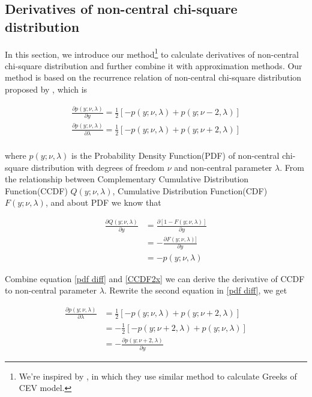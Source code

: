 \subsection{Derivatives of non-central chi-square distribution}

In this section, we introduce our method\footnote{We're inspired by \cite{larguinho_computation_2013}, in which they use similar method to calculate Greeks of CEV model.} to calculate derivatives of non-central chi-square distribution and further combine it with approximation methods. Our method is based on the recurrence relation of non-central chi-square distribution proposed by \cite{cohen_noncentral_1988}, which is

\begin{equation}\label{pdf diff}
    \begin{gathered}
        \frac{\partial p(y;\nu,\lambda)}{\partial y}=\frac{1}{2}[-p(y ; \nu, \lambda)+p(y ; \nu-2, \lambda)]\\
        \frac{\partial p(y;\nu,\lambda)}{\partial \lambda}=\frac{1}{2}[-p(y ; \nu, \lambda)+p(y ; \nu+2, \lambda)] \\
    \end{gathered}
\end{equation}

\noindent where $p(y;\nu,\lambda)$ is the Probability Density Function(PDF) of non-central chi-square distribution with degrees of freedom $\nu$ and non-central parameter $\lambda$. From the relationship between Complementary Cumulative Distribution Function(CCDF) $Q(y;\nu,\lambda)$, Cumulative Distribution Function(CDF) $F(y;\nu,\lambda)$, and about PDF we know that

\begin{equation}\label{CCDF2x}
    \begin{aligned}
        \frac{\partial Q(y; \nu, \lambda)}{\partial y}&=\frac{\partial[1-F(y; \nu, \lambda)]}{\partial y} \\ 
        &=-\frac{\partial F(y; \nu, \lambda)]}{\partial y}\\
        &= -p(y;\nu,\lambda)
    \end{aligned}
\end{equation}

Combine equation \eqref{pdf diff} and \eqref{CCDF2x} we can derive the derivative of CCDF to non-central parameter $\lambda$. Rewrite the second equation in \eqref{pdf diff}, we get

\begin{equation}\label{pdf trans}
    \begin{aligned}
        \frac{\partial p(y;\nu,\lambda)}{\partial \lambda}&=\frac{1}{2}[-p(y ; \nu, \lambda)+p(y ; \nu+2, \lambda)] \\
        &=-\frac{1}{2}[-p(y ; \nu+2, \lambda)+p(y ; \nu, \lambda)]\\
        &= -\frac{\partial p(y;\nu+2,\lambda)}{\partial y}
    \end{aligned}
\end{equation}

